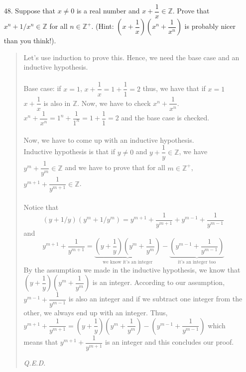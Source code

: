 \documentclass[12pt, a4paper]{article}                      %
\newcommand{\intz}{\mathbb{Z}}
\newcommand{\intzp}{\mathbb{Z^+}}
\begin{document}
\begin{itemize}
\item[48.]
Suppose that $x \neq 0$ is a real number and $x + \dfrac{1}{x} \in \intz$.
Prove that $x^n + 1/x^n \in \intz$ for all $n \in \intzp$. (Hint: $(x + \dfrac{1}{x})(x^n + \dfrac{1}{x^n})$ is probably nicer than you think!).
\begin{quote}
Let's use induction to prove this. Hence, we need the base case and an inductive hypothesis.\\\\
Base case: if $x = 1$, $x + \dfrac{1}{x} = 1 + \dfrac{1}{1} = 2$ thus, we have that if $x = 1$
$x + \dfrac{1}{x}$ is also in $\intz$. Now, we have to check $x^n + \dfrac{1}{x^n}$.
$x^n + \dfrac{1}{x^n} = 1^n + \dfrac{1}{1^n} = 1 + \dfrac{1}{1} = 2$ and the base case is checked.\\\\
Now, we have to come up with an inductive hypothesis.\\
Inductive hypothesis is that if $y \neq 0$ and $y + \dfrac{1}{y} \in \intz$, we have $y^m + \dfrac{1}{y^m} \in \intz$ and we have to prove that for all $m \in \intzp$,
$y^{m + 1} + \dfrac{1}{y^{m + 1}} \in \intz$.\\\\
Notice that
$$(y + 1/y)(y^m + 1/y^m) =  y^{m + 1} + \dfrac{1}{y^{m + 1}} + y^{m - 1} + \dfrac{1}{y^{m - 1}}$$
and
$$y^{m + 1} + \dfrac{1}{y^{m + 1}} = \underbrace{(y + \dfrac{1}{y})(y^m + \dfrac{1}{y^m})}_{\mbox{we know it's an integer}} - \underbrace{(y^{m - 1} + \dfrac{1}{y^{m - 1}})}_{\mbox{it's an integer too}}$$
By the assumption we made in the inductive hypothesis, we know that $(y + \dfrac{1}{y})(y^m + \dfrac{1}{y^m})$ is an integer.
According to our assumption, $y^{m - 1} + \dfrac{1}{y^{m - 1}}$ is also an integer and if we subtract one integer from the other, we always end up with an integer.
Thus, $y^{m + 1} + \dfrac{1}{y^{m + 1}} = (y + \dfrac{1}{y})(y^m + \dfrac{1}{y^m}) - (y^{m - 1} + \dfrac{1}{y^{m - 1}})$ which means that $y^{m + 1} + \dfrac{1}{y^{m + 1}}$
is an integer and this concludes our proof.
\begin{flushright}
\textit{Q.E.D.}
\end{flushright}
\end{quote}


\end{itemize}
\end{document}
